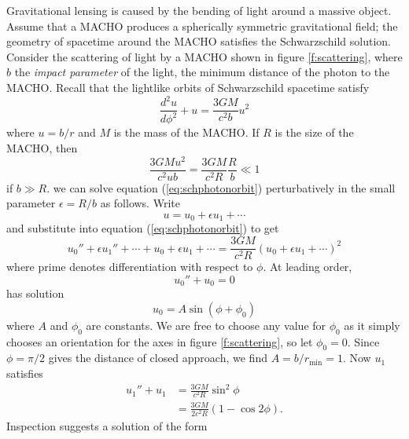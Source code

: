 Gravitational lensing is caused by the bending of light around a massive
object. Assume that a MACHO produces a spherically symmetric gravitational
field; the geometry of spacetime around the MACHO satisfies the Schwarzschild
solution. Consider the scattering of light by a MACHO shown in figure
\ref{f:scattering}, where $b$ the \emph{impact parameter} of the light, 
the minimum distance of the photon to the MACHO.   Recall that the
lightlike orbits of Schwarzschild spacetime satisfy\cite{Wald:1984}
\begin{equation}
\frac{d^2 u}{d\phi^2} + u = \frac{3GM}{c^2 b}u^2
\label{eq:schphotonorbit}
\end{equation}
where $u = b/r$ and $M$ is the mass
of the MACHO. If $R$ is the size of the
MACHO, then
\begin{equation}
\frac{3GMu^2}{c^2ub} = \frac{3GM}{c^2R} \frac{R}{b} \ll 1
\end{equation}
if $b \gg R$. we can solve equation (\ref{eq:schphotonorbit}) perturbatively
in the small parameter $\epsilon = R / b$ as follows. Write
\begin{equation}
u = u_0 + \epsilon u_1 + \cdots
\end{equation}
and substitute into equation (\ref{eq:schphotonorbit}) to get
\begin{equation}
u_0'' + \epsilon u_1'' + \cdots + u_0 + \epsilon u_1 + \cdots 
= \frac{3GM}{c^2R}\left(u_0 + \epsilon u_1 + \cdots\right)^2 
\end{equation}
where prime denotes differentiation with respect to $\phi$. At leading order,
\begin{equation}
u_0'' + u_0 = 0
\end{equation}
has solution
\begin{equation}
u_0 = A \sin \left(\phi + \phi_0\right)
\end{equation}
where $A$ and $\phi_0$ are constants. We are free to choose any value for
$\phi_0$ as it simply chooses an orientation for the axes in figure
\ref{f:scattering}, so let $\phi_0 = 0$. Since $\phi = \pi / 2$
gives the distance of closed approach, we find $A = b / r_\mathrm{min} = 1$.
Now $u_1$ satisfies
\begin{equation}
\begin{split}
u_1'' + u_1 &= \frac{3GM}{c^2 R} \sin^2 \phi \\
&= \frac{3GM}{2c^2 R}\left(1 - \cos 2\phi\right).
\label{eq:u1eq}
\end{split}
\end{equation}
Inspection suggests a solution of the form
